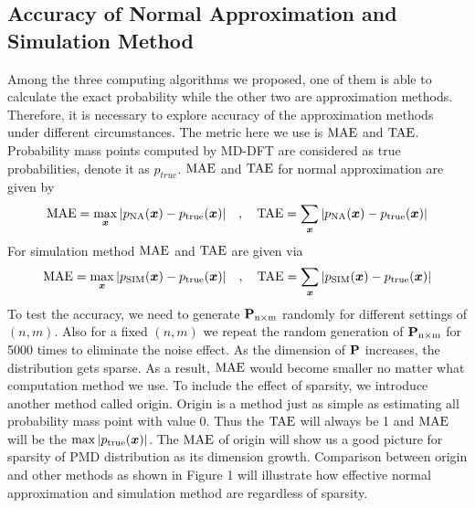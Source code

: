 \documentclass[12pt]{article}
\newcommand{\TAE}{{\rm TAE}}
\newcommand{\MAE}{{\rm MAE}}
\newcommand{\PMD}{\textrm{PMD}}
\newcommand{\xvec}{\boldsymbol{x}}
\begin{document}
\subsection{Accuracy of Normal Approximation and Simulation Method}
Among the three computing algorithms we proposed, one of them is able to calculate the exact probability while the other two are approximation methods. Therefore, it is necessary to explore accuracy of the approximation methods under different circumstances. The metric here we use is $\MAE$ and $\TAE$. Probability mass points computed by MD-DFT are considered as true probabilities, denote it as $p_{true}$.
$\MAE$ and $\TAE$ for normal approximation are given by
\begin{equation*}
    \MAE = \max_{\xvec}|p_{\rm NA}(\xvec)-p_{\rm true}(\xvec)| \quad, \quad  \TAE = \sum_{\xvec}|p_{\rm NA}(\xvec)-p_{\rm true}(\xvec)|
\end{equation*}
For simulation method $\MAE$ and $\TAE$ are given via
\begin{equation*}
    \MAE = \max_{\xvec}|p_{\rm SIM}(\xvec)-p_{\rm true}(\xvec)| \quad, \quad  \TAE = \sum_{\xvec}|p_{\rm SIM
    }(\xvec)-p_{\rm true}(\xvec)|
\end{equation*}
To test the accuracy, we need to generate $\boldsymbol{\rm P}_{\rm n \times \rm m}$ randomly for different settings of $(n,m)$. Also for a fixed $(n,m)$ we repeat the random generation of $\boldsymbol{\rm P}_{\rm n \times \rm m}$ for 5000 times to eliminate the noise effect. As the dimension of $\boldsymbol{\rm P}$ increases, the distribution gets sparse. As a result, $\MAE$ would become smaller no matter what computation method we use. To include the effect of sparsity, we introduce another method called origin. Origin is a method just as simple as estimating all probability mass point with value 0. Thus the $\TAE$ will always be 1 and $\MAE$ will be the $\max |p_{\rm true}(\xvec)|$. The $\MAE$ of origin will show us a good picture for sparsity of $\PMD$ distribution as its dimension growth. Comparison between origin and other methods as shown in Figure 1 will illustrate how effective normal approximation and simulation method are regardless of sparsity.
\end{document}
